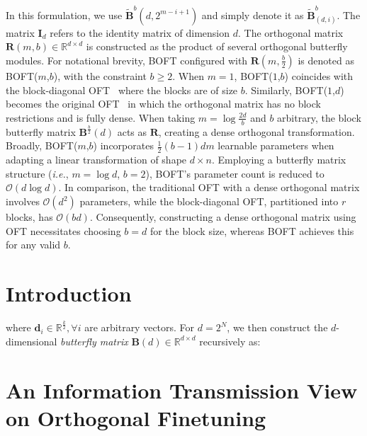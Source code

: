In this formulation, we use $\tilde{\bm{B}}^b(d,2^{m - i+1})$ and simply denote it as $\tilde{\bm{B}}^b_{(d,i)}$. The matrix $\bm{I}_d$ refers to the identity matrix of dimension $d$. The orthogonal matrix $\bm{R}(m,b) \in \mathbb{R}^{d\times d}$ is constructed as the product of several orthogonal butterfly modules. For notational brevity, BOFT configured with $\bm{R}(m,\frac{b}{2})$ is denoted as BOFT($m$,$b$), with the constraint $b \geq 2$. When $m=1$, BOFT($1$,$b$) coincides with the block-diagonal OFT~\cite{qiu2023controlling} where the blocks are of size $b$. Similarly, BOFT($1$,$d$) becomes the original OFT~\cite{qiu2023controlling} in which the orthogonal matrix has no block restrictions and is fully dense. When taking $m = \log \frac{2d}{b}$ and $b$ arbitrary, the block butterfly matrix $\bm{B}^{\frac{b}{2}}(d)$ acts as $\bm{R}$, creating a dense orthogonal transformation. Broadly, BOFT($m$,$b$) incorporates $\frac{1}{2}(b-1)dm$ learnable parameters when adapting a linear transformation of shape $d\times n$. Employing a butterfly matrix structure (\emph{i.e.}, $m=\log d$, $b=2$), BOFT’s parameter count is reduced to $\mathcal{O}(d\log d)$. In comparison, the traditional OFT with a dense orthogonal matrix involves $\mathcal{O}(d^2)$ parameters, while the block-diagonal OFT, partitioned into $r$ blocks, has $\mathcal{O}(bd)$. Consequently, constructing a dense orthogonal matrix using OFT necessitates choosing $b=d$ for the block size, whereas BOFT achieves this for any valid $b$.

\section{Introduction}

where $\bm{d}_i\in\mathbb{R}^{\frac{k}{2}},\forall i$ are arbitrary vectors. For $d = 2^N$, we then construct the $d$-dimensional \emph{butterfly matrix} $\bm{B}(d)\in\mathbb{R}^{d\times d}$ recursively as:

\section{An Information Transmission View on Orthogonal Finetuning}


